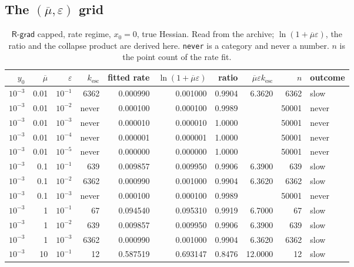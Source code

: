 \documentclass[11pt,a4paper]{article}
\providecommand{\Rgrad}{\textsf{R-grad}}
\theoremstyle{definition}
\theoremstyle{remark}
\begin{document}
\subsection{The \texorpdfstring{$(\overline{\mu},\varepsilon)$}{(mu-bar, eps)} grid}

\begin{table}[H]
  \centering\footnotesize
  \caption{$\Rgrad$ capped, rate regime, $x_0 = 0$, true Hessian. Read from the
    archive; $\ln(1+\overline{\mu}\varepsilon)$, the ratio and the collapse
    product are derived here. \texttt{never} is a category and never a number.
    $n$ is the point count of the rate fit.}
  \label{tab: grid grad}
  \begin{tabular}{rrrrrrrrrl}
    \toprule
    $y_0$ & $\overline{\mu}$ & $\varepsilon$ & $k_{\mathrm{esc}}$
      & fitted rate & $\ln(1+\overline{\mu}\varepsilon)$ & ratio
      & $\overline{\mu}\varepsilon k_{\mathrm{esc}}$ & $n$ & outcome \\
    \midrule
    $10^{-3}$ & 0.01 & $10^{-1}$ & 6362  & 0.000990 & 0.001000 & 0.9904 & 6.3620 & 6362  & slow \\
    $10^{-3}$ & 0.01 & $10^{-2}$ & never & 0.000100 & 0.000100 & 0.9989 &        & 50001 & never \\
    $10^{-3}$ & 0.01 & $10^{-3}$ & never & 0.000010 & 0.000010 & 1.0000 &        & 50001 & never \\
    $10^{-3}$ & 0.01 & $10^{-4}$ & never & 0.000001 & 0.000001 & 1.0000 &        & 50001 & never \\
    $10^{-3}$ & 0.01 & $10^{-5}$ & never & 0.000000 & 0.000000 & 1.0000 &        & 50001 & never \\
    $10^{-3}$ & 0.1  & $10^{-1}$ & 639   & 0.009857 & 0.009950 & 0.9906 & 6.3900 & 639   & slow \\
    $10^{-3}$ & 0.1  & $10^{-2}$ & 6362  & 0.000990 & 0.001000 & 0.9904 & 6.3620 & 6362  & slow \\
    $10^{-3}$ & 0.1  & $10^{-3}$ & never & 0.000100 & 0.000100 & 0.9989 &        & 50001 & never \\
    $10^{-3}$ & 1    & $10^{-1}$ & 67    & 0.094540 & 0.095310 & 0.9919 & 6.7000 & 67    & slow \\
    $10^{-3}$ & 1    & $10^{-2}$ & 639   & 0.009857 & 0.009950 & 0.9906 & 6.3900 & 639   & slow \\
    $10^{-3}$ & 1    & $10^{-3}$ & 6362  & 0.000990 & 0.001000 & 0.9904 & 6.3620 & 6362  & slow \\
    $10^{-3}$ & 10   & $10^{-1}$ & 12    & 0.587519 & 0.693147 & 0.8476 & 12.0000 & 12   & slow \\

\end{tabular}
\end{table}
\end{document}
